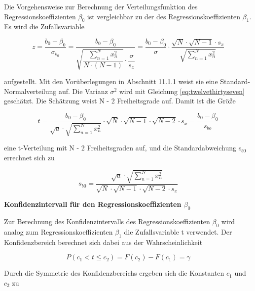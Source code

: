 \noindent Die Vorgehensweise zur Berechnung der Verteilungsfunktion des Regressionskoeffizienten $\beta_{0}$ ist vergleichbar zu der des Regressionskoeffizienten $\beta_{1}$. Es wird die Zufallsvariable

\begin{equation}\label{eq:twelvesixtytwo}
z=\dfrac{b_{0} -\beta _{0} }{\sigma _{b_{0}}} =\dfrac{b_{0} -\beta _{0} }{\sqrt{\dfrac{\sum _{n=1}^{N}x_{n}^{2}  }{N\cdot (N-1)}} \cdot \dfrac{\sigma }{s_{x}}} =\dfrac{b_{0} -\beta _{0}}{\sigma } \cdot \dfrac{\sqrt{N} \cdot \sqrt{N-1} \cdot s_{x} }{\sqrt{\sum _{n=1}^{N}x_{n}^{2}}}
\end{equation}

\noindent aufgestellt. Mit den Vor\"{u}berlegungen in Abschnitt 11.1.1 weist sie eine Standard-Normalverteilung auf. Die Varianz $\sigma^{2}$ wird mit Gleichung \eqref{eq:twelvethirtyseven} gesch\"{a}tzt. Die Sch\"{a}tzung weist N - 2 Freiheitsgrade auf. Damit ist die Gr\"{o}{\ss}e 

\begin{equation}\label{eq:twelvesixtythree}
t=\dfrac{b_{0} -\beta _{0} }{\sqrt{a} \cdot \sqrt{\sum _{n=1}^{N}x_{n}^{2}  } } \cdot \sqrt{N} \cdot \sqrt{N-1} \cdot \sqrt{N-2} \cdot s_{x} =\dfrac{b_{0} -\beta _{0} }{s_{bo}}
\end{equation}

\noindent eine t-Verteilung mit N - 2 Freiheitsgraden auf, und die Standardabweichung s$_{b0}$ errechnet sich zu

\begin{equation}\label{eq:twelvesixtyfour}
s_{b0} =\dfrac{\sqrt{a} \cdot \sqrt{\sum _{n=1}^{N}x_{n}^{2}}}{\sqrt{N} \cdot \sqrt{N-1} \cdot \sqrt{N-2} \cdot s_{x}}
\end{equation}

{\selectfont
\noindent\textbf{Konfidenzintervall f\"{u}r den Regressionskoeffizienten $\beta_{0}$ }}\smallskip

\noindent Zur Berechnung des Konfidenzintervalls des Regressionskoeffizienten $\beta_{0}$ wird analog zum Regressionskoeffizienten $\beta_{1}$ die Zufallsvariable t verwendet. Der Konfidenzbereich berechnet sich dabei aus der Wahrscheinlichkeit

\begin{equation}\label{eq:twelvesixtyfive}
P(c_{1} <t\le c_{2})=F(c_{2})-F(c_{1})=\gamma
\end{equation}

\noindent Durch die Symmetrie des Konfidenzbereichs ergeben sich die Konstanten $c_{1}$ und $c_{2}$ zu

